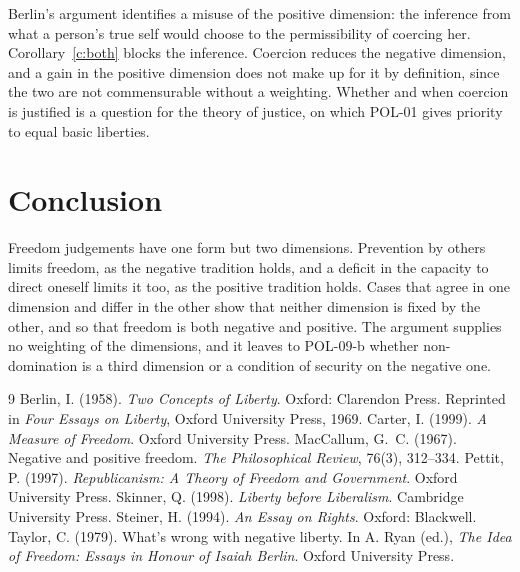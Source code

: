 \documentclass{situationist-preprint}
\begin{document}
\begin{reply}
Berlin's argument identifies a misuse of the positive dimension: the inference from what a person's true self would choose to the permissibility of coercing her. Corollary~\ref{c:both} blocks the inference. Coercion reduces the negative dimension, and a gain in the positive dimension does not make up for it by definition, since the two are not commensurable without a weighting. Whether and when coercion is justified is a question for the theory of justice, on which POL-01 gives priority to equal basic liberties.
\end{reply}

\section{Conclusion}

Freedom judgements have one form but two dimensions. Prevention by others limits freedom, as the negative tradition holds, and a deficit in the capacity to direct oneself limits it too, as the positive tradition holds. Cases that agree in one dimension and differ in the other show that neither dimension is fixed by the other, and so that freedom is both negative and positive. The argument supplies no weighting of the dimensions, and it leaves to POL-09-b whether non-domination is a third dimension or a condition of security on the negative one.

\begin{thebibliography}{9}\small
{} Berlin, I. (1958). \emph{Two Concepts of Liberty}. Oxford: Clarendon Press. Reprinted in \emph{Four Essays on Liberty}, Oxford University Press, 1969.
 Carter, I. (1999). \emph{A Measure of Freedom}. Oxford University Press.
 MacCallum, G.~C. (1967). Negative and positive freedom. \emph{The Philosophical Review}, 76(3), 312--334.
 Pettit, P. (1997). \emph{Republicanism: A Theory of Freedom and Government}. Oxford University Press.
 Skinner, Q. (1998). \emph{Liberty before Liberalism}. Cambridge University Press.
 Steiner, H. (1994). \emph{An Essay on Rights}. Oxford: Blackwell.
 Taylor, C. (1979). What's wrong with negative liberty. In A. Ryan (ed.), \emph{The Idea of Freedom: Essays in Honour of Isaiah Berlin}. Oxford University Press.
\end{thebibliography}
\end{document}
